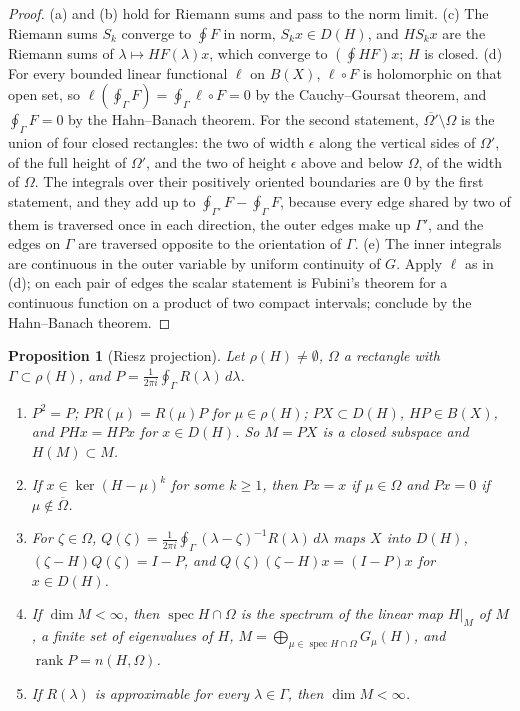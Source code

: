 \documentclass[11pt]{article}
\newtheorem{proposition}[lemma]{Proposition}
\theoremstyle{definition}
\newcommand{\spec}{\operatorname{spec}}
\newcommand{\rank}{\operatorname{rank}}
\begin{document}
\begin{proof}
(a) and (b) hold for Riemann sums and pass to the norm limit. (c) The Riemann sums $S_k$ converge to $\oint F$ in norm, $S_kx \in D(H)$, and $HS_kx$ are the Riemann sums of $\lambda \mapsto HF(\lambda)x$, which converge to $(\oint HF)x$; $H$ is closed. (d) For every bounded linear functional $\ell$ on $B(X)$, $\ell\circ F$ is holomorphic on that open set, so $\ell(\oint_\Gamma F) = \oint_\Gamma\ell\circ F = 0$ by the Cauchy--Goursat theorem, and $\oint_\Gamma F = 0$ by the Hahn--Banach theorem. For the second statement, $\overline{\Omega'}\setminus\Omega$ is the union of four closed rectangles: the two of width $\epsilon$ along the vertical sides of $\Omega'$, of the full height of $\Omega'$, and the two of height $\epsilon$ above and below $\Omega$, of the width of $\Omega$. The integrals over their positively oriented boundaries are $0$ by the first statement, and they add up to $\oint_{\Gamma'}F - \oint_\Gamma F$, because every edge shared by two of them is traversed once in each direction, the outer edges make up $\Gamma'$, and the edges on $\Gamma$ are traversed opposite to the orientation of $\Gamma$. (e) The inner integrals are continuous in the outer variable by uniform continuity of $G$. Apply $\ell$ as in (d); on each pair of edges the scalar statement is Fubini's theorem for a continuous function on a product of two compact intervals; conclude by the Hahn--Banach theorem.
\end{proof}

\begin{proposition}[Riesz projection]\label{prop:A-riesz}
Let $\rho(H) \ne \emptyset$, $\Omega$ a rectangle with $\Gamma \subset \rho(H)$, and $P = \frac{1}{2\pi i}\oint_\Gamma R(\lambda)\,d\lambda$.
\begin{enumerate}
\item[(a)] $P^2 = P$; $PR(\mu) = R(\mu)P$ for $\mu \in \rho(H)$; $PX \subset D(H)$, $HP \in B(X)$, and $PHx = HPx$ for $x \in D(H)$. So $M = PX$ is a closed subspace and $H(M) \subset M$.
\item[(b)] If $x \in \ker(H - \mu)^k$ for some $k \ge 1$, then $Px = x$ if $\mu \in \Omega$ and $Px = 0$ if $\mu \notin \overline\Omega$.
\item[(c)] For $\zeta \in \Omega$, $Q(\zeta) = \frac{1}{2\pi i}\oint_\Gamma(\lambda - \zeta)^{-1}R(\lambda)\,d\lambda$ maps $X$ into $D(H)$, $(\zeta - H)Q(\zeta) = I - P$, and $Q(\zeta)(\zeta - H)x = (I - P)x$ for $x \in D(H)$.
\item[(d)] If $\dim M < \infty$, then $\spec H \cap \Omega$ is the spectrum of the linear map $H|_M$ of $M$, a finite set of eigenvalues of $H$, $M = \bigoplus_{\mu\in\spec H\cap\Omega}G_\mu(H)$, and $\rank P = n(H, \Omega)$.
\item[(e)] If $R(\lambda)$ is approximable for every $\lambda \in \Gamma$, then $\dim M < \infty$.
\end{enumerate}
\end{proposition}
\end{document}
